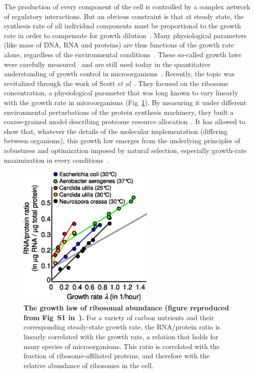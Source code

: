 The production of every component of the cell is controlled by a complex network of regulatory interactions.
But an obvious constraint is that at steady state, the synthesis rate of all individual components must be proportional to the growth rate in order to compensate for growth dilution~\cite{monod_growth_1949}.
Many physiological parameters (like mass of DNA, RNA and proteins) are thus functions of the growth rate alone, regardless of the environmental conditions~\cite{schaechter_dependency_1958,bremer_modulation_1996}.
These so-called growth laws were carefully measured~\cite{bremer_modulation_1996} and are still used today in the quantitative understanding of growth control in microorganisms~\cite{ehrenberg_mediumdependent_2012}.
Recently, the topic was revitalized through the work of Scott \textit{et al}~\cite{scott_bacterial_2011}.
They focused on the ribosome concentration, a physiological parameter that was long known to vary linearly with the growth rate in microorganisms (Fig~\ref{fig:scott_rnaprot}).
By measuring it under different environmental perturbations of the protein synthesis machinery, they built a coarse-grained model describing proteome resource allocation~\cite{scott_emergence_2014}.
It has allowed to show that, whatever the details of the molecular implementation (differing between organisms), this growth law emerges from the underlying principles of robustness and optimization imposed by natural selection, especially growth-rate maximization in every conditions~\cite{scott_emergence_2014}.

\begin{figure}[tb]
\centering
\includegraphics[height=7cm]{./Fig/Chapter1/scott_rnaprot}
\caption{
\textbf{The growth law of ribosomal abundance (figure reproduced from Fig~S1 in~\cite{scott_interdependence_2010}).}
For a variety of carbon nutrients and their corresponding steady-state growth rate, the RNA/protein ratio is linearly correlated with the growth rate, a relation that holds for many species of microorganisms.
This ratio is correlated with the fraction of ribosome-affiliated proteins, and therefore with the relative abundance of ribosomes in the cell.
}
\label{fig:scott_rnaprot}
\end{figure}

